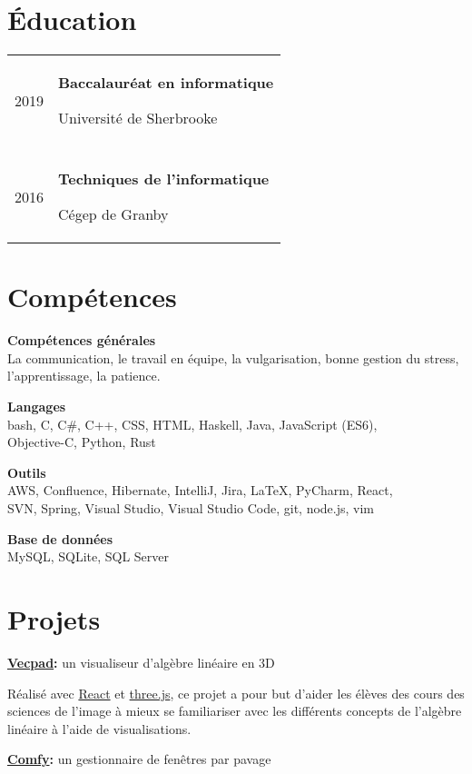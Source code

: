 \documentclass[french]{article}
\newcommand{\separation}{\multicolumn{1}{c}{} \\}
\begin{document}
	\section{Éducation}
	\begin{tabu} to \textwidth {r|X}
		2019 & {
			{\large \bfseries Baccalauréat en informatique}

			Université de Sherbrooke
		} \\
		\separation{}
		2016 & {
			{\large \bfseries Techniques de l'informatique}

			Cégep de Granby
		} \\
	\end{tabu}

	\section{Compétences}

	\textbf{Compétences générales} \\
	La communication, le travail en équipe, la vulgarisation, bonne gestion du stress, l'apprentissage, la patience.

	\textbf{Langages} \\
	{\ttfamily bash, C, C\#, C++, CSS, HTML, Haskell, Java, JavaScript (ES6), \\ Objective-C, Python, Rust}

	\textbf{Outils} \\
	{\ttfamily AWS, Confluence, Hibernate, IntelliJ, Jira,} \LaTeX{\ttfamily , PyCharm, React, \\ SVN, Spring, Visual Studio, Visual Studio Code, git, node.js, vim}

	\textbf{Base de données} \\
	{\ttfamily MySQL, SQLite, SQL Server}

	\section{Projets}
	{\large \bfseries \href{https://vecpad.netlify.com/}{Vecpad}:}
	{\large un visualiseur d'algèbre linéaire en 3D}

	Réalisé avec \href{https://reactjs.org/}{React} et \href{https://threejs.org/}{three.js}, ce projet a pour but d'aider les élèves des cours des sciences de l'image à mieux se familiariser avec les différents concepts de l'algèbre linéaire à l'aide de visualisations.

	\bigskip
	{\large \bfseries \href{https://github.com/daniel-junior-dube/comfywm}{Comfy}:}
	{\large un gestionnaire de fenêtres par pavage}
\end{document}
